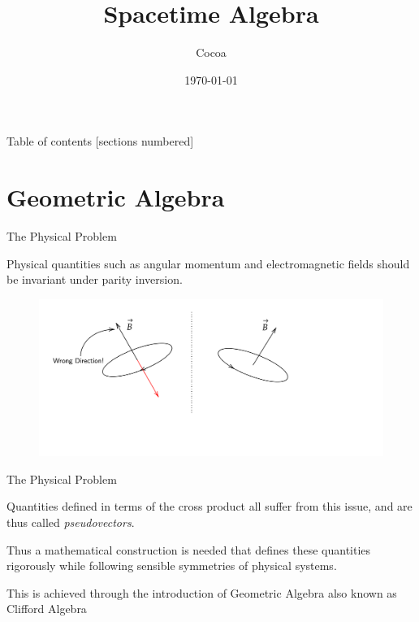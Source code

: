 \documentclass{beamer}
\title {Spacetime Algebra}
\author {Cocoa}
\date{\today}
\institute{Ashoka University}
\begin{document}
\maketitle
	
\begin{frame}{Table of contents}
	[sections numbered]
	\tableofcontents[hideallsubsections]
\end{frame}

\section{Geometric Algebra}

\begin{frame}{The Physical Problem}

Physical quantities such as angular momentum and electromagnetic fields should be invariant under parity inversion. 
\pause

\begin{figure}
	\centering
	\includegraphics[scale=0.13]{Figures/BField.png}
\end{figure}
\end{frame}

\begin{frame}{The Physical Problem}

Quantities defined in terms of the cross product all suffer from this issue, and are thus called \emph{pseudovectors}.
\pause

Thus a mathematical construction is needed that defines these quantities rigorously while following sensible symmetries of physical systems.
\pause

This is achieved through the introduction of \alert{Geometric Algebra} also known as Clifford Algebra 
	
\end{frame}
\end{document}
